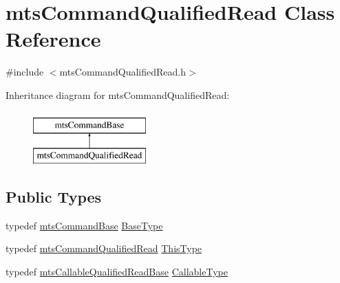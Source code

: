 \hypertarget{classmts_command_qualified_read}{}\section{mts\+Command\+Qualified\+Read Class Reference}
\label{classmts_command_qualified_read}


{\ttfamily \#include $<$mts\+Command\+Qualified\+Read.\+h$>$}

Inheritance diagram for mts\+Command\+Qualified\+Read\+:\begin{figure}[H]
\begin{center}
\leavevmode
\includegraphics[height=2.000000cm]{df/df8/classmts_command_qualified_read}
\end{center}
\end{figure}
\subsection*{Public Types}
\begin{DoxyCompactItemize}
\item 
typedef \hyperlink{classmts_command_base}{mts\+Command\+Base} \hyperlink{classmts_command_qualified_read_a594530e3533708ab5f6535c5ccf6addd}{Base\+Type}
\item 
typedef \hyperlink{classmts_command_qualified_read}{mts\+Command\+Qualified\+Read} \hyperlink{classmts_command_qualified_read_a360793a513215088a297832b6066f368}{This\+Type}
\item 
typedef \hyperlink{classmts_callable_qualified_read_base}{mts\+Callable\+Qualified\+Read\+Base} \hyperlink{classmts_command_qualified_read_a95ca582ba302ac597fb9106a8270cce5}{Callable\+Type}
\end{DoxyCompactItemize}
